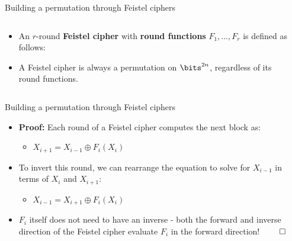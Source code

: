 \documentclass[aspectratio=169, lualatex, handout]{beamer}
\begin{document}
\begin{frame}{Building a permutation through Feistel ciphers}
	\begin{columns}[c]
		\begin{column}{0.5\textwidth}
			\begin{itemize}
				\item An $r$-round \textbf{Feistel cipher} with \textbf{round functions} $F_1,\ldots,F_r$ is defined as follows:\\
				      \begin{center}
				      \end{center}
				\item A Feistel cipher is always a permutation on $\bits^{2n}$, regardless of its round functions.
			\end{itemize}
		\end{column}
		\begin{column}{0.5\textwidth}
		\end{column}
	\end{columns}
\end{frame}

\begin{frame}{Building a permutation through Feistel ciphers}
	\begin{itemize}
		\item \textbf{Proof:} Each round of a Feistel cipher computes the next block as:
		      \begin{itemize}
			      \item $X_{i+1} = X_{i-1} \oplus F_{i}(X_{i})$
		      \end{itemize}
		\item To invert this round, we can rearrange the equation to solve for $X_{i-1}$ in terms of $X_{i}$ and $X_{i+1}$:
		      \begin{itemize}
			      \item $X_{i-1} = X_{i+1} \oplus F_{i}(X_{i})$
		      \end{itemize}
		\item $F_i$ itself does not need to have an inverse - both the forward and inverse direction of the Feistel cipher evaluate $F_i$ in the forward direction! $\qed$
	\end{itemize}
\end{frame}
\end{document}
